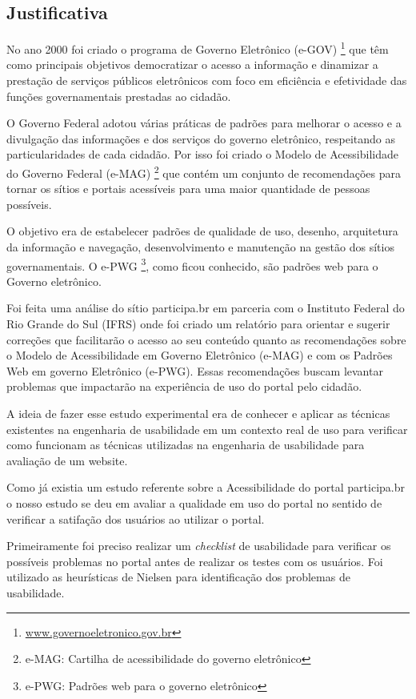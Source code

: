 \subsection{Justificativa}		
	

	No ano 2000 foi criado o programa de Governo Eletrônico (e-GOV) \footnote{\url{www.governoeletronico.gov.br}} que têm como principais objetivos democratizar o acesso a informação e dinamizar a prestação de serviços públicos eletrônicos com foco em eficiência e efetividade das funções governamentais prestadas ao cidadão.

	O Governo Federal adotou várias práticas de padrões para melhorar o acesso e a divulgação das informações e dos serviços do governo eletrônico, respeitando as particularidades de cada cidadão. Por isso foi criado o Modelo de Acessibilidade do Governo Federal (e-MAG) \footnote{e-MAG: Cartilha de acessibilidade do governo eletrônico} que contém um conjunto de recomendações para tornar os sítios e portais acessíveis para uma maior quantidade de pessoas possíveis. 

	O objetivo era de estabelecer padrões de qualidade de uso, desenho, arquitetura da informação e navegação, desenvolvimento e manutenção na gestão dos sítios governamentais. O e-PWG \footnote{e-PWG: Padrões web para o governo eletrônico}, como ficou conhecido, são padrões web para o Governo eletrônico.

	Foi feita uma análise do sítio participa.br em parceria com o Instituto Federal do Rio Grande do Sul (IFRS) onde foi criado um relatório para orientar e sugerir correções que facilitarão o acesso ao seu conteúdo quanto as recomendações sobre o Modelo de Acessibilidade em Governo Eletrônico (e-MAG) e com os Padrões Web em governo Eletrônico (e-PWG). Essas recomendações buscam levantar problemas que impactarão na experiência de uso do portal pelo cidadão.

	A ideia de fazer esse estudo experimental era de conhecer e aplicar as técnicas existentes na engenharia de usabilidade em um contexto real de uso para verificar como funcionam as técnicas utilizadas na engenharia de usabilidade para avaliação de um website.

	Como já existia um estudo referente sobre a Acessibilidade do portal participa.br o nosso estudo se deu em avaliar a qualidade em uso do portal no sentido de verificar a satifação dos usuários ao utilizar o portal.

	Primeiramente foi preciso realizar um \textit{checklist} de usabilidade para verificar os possíveis problemas no portal antes de realizar os testes com os usuários. Foi utilizado as heurísticas de Nielsen para identificação dos problemas de usabilidade.

